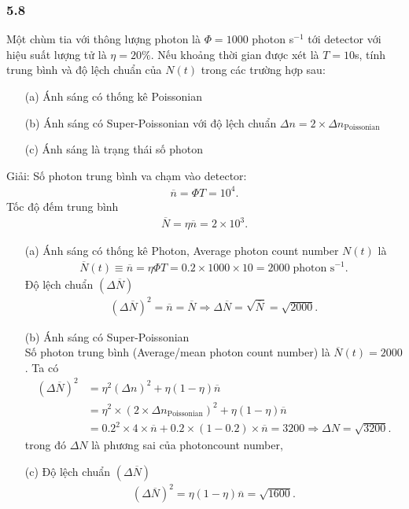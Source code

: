 \documentclass{article}
\begin{document}
\subsubsection*{5.8}
Một chùm tia với thông lượng photon là $\Phi = 1000$ photon s$^{-1}$ tới detector với hiệu suất lượng tử là $\eta = 20 \%$. Nếu khoảng thời gian được xét là $T = 10$s, tính trung bình và độ lệch chuẩn của $N(t)$ trong các trường hợp sau:
\begin{enumerate}
	\item[(a)] Ánh sáng có thống kê Poissonian
	\item[(b)] Ánh sáng có Super-Poissonian với độ lệch chuẩn $\Delta n = 2\times \Delta n_{\text{Poissonian}}$
	\item[(c)] Ánh sáng là trạng thái số photon
\end{enumerate}
Giải:
Số photon trung bình va chạm vào detector:
\begin{align*}
	\overline{n} = \Phi T = 10^4.
\end{align*}
Tốc độ đếm trung bình
\begin{align*}
	\overline{N} = \eta \overline{n} = 2\times 10^3.
\end{align*}
\begin{enumerate}
	\item[(a)] Ánh sáng có thống kê Photon, Average photon count number $N(t)$ là
	      \begin{align*}
		      \overline{N}(t) \equiv \overline{n}= \eta \Phi T = 0.2 \times 1000 \times 10 = 2000 \; \text{photon s}^{-1}.
	      \end{align*}
	      Độ lệch chuẩn $(\Delta \overline{N})$
	      \begin{align*}
		      (\Delta \overline{N})^2 = \overline{n} = \overline{N} \Rightarrow \Delta \overline{N} = \sqrt{\overline{N}} = \sqrt{2000}.
	      \end{align*}
	\item[(b)] Ánh sáng có Super-Poissonian\\
	      Số photon trung bình (Average/mean photon count number) là $\overline{N}(t) = 2000$. Ta có
	      \begin{align*}
		      (\Delta \overline{N})^2
		       & = \eta^2 (\Delta n)^2 + \eta ( 1 - \eta ) \overline{n} \tag{5.56 M.Fox}                                                                     \\
		       & =  \eta^2 \times (2 \times \Delta n_{\text{Poissonian}})^2 + \eta ( 1 - \eta ) \overline{n}                                                 \\
		       & = 0.2^2 \times 4 \times \overline{n} + 0.2 \times (1 - 0.2) \times \overline{n} = 3200 \Rightarrow \Delta N = \sqrt{3200}. \tag{5.15 M.Fox}
	      \end{align*}
	      trong đó $\Delta N$ là phương sai của photoncount number,
	\item[(c)]
	      Độ lệch chuẩn $(\Delta \overline{N})$
	      \begin{align*}
		      (\Delta \overline{N})^2 = \eta(1-\eta) \overline{n} = \sqrt{1600}.
	      \end{align*}
\end{enumerate}
\end{document}

